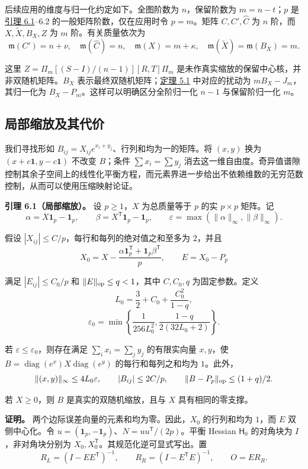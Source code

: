 \documentclass[11pt,a4paper]{article}
\makeatletter
\newcommand{\paperstatement}[3]{\par\addvspace{6pt}\Needspace{4\baselineskip}\phantomsection\def\@currentlabel{#2}\label{#3}\noindent\textbf{#1}\enspace}
\newcommand{\paperref}[2]{\hyperref[#1]{#2}}
\makeatother
\begin{document}
后续应用的维度与归一化约定如下。全图阶数为 \(n\)，保留阶数为 \(m=n-t\)；\(p\) 是\paperref{thm-6.1}{引理 6.1}--6.2 的一般矩阵阶数，仅在应用时令 \(p=m\)。矩阵 \(C,C',\widehat C\) 为 \(n\) 阶，而 \(X,\widetilde X,B_X,Z\) 为 \(m\) 阶。有关质量依次为
\[\mathfrak m(C')=n+\nu,\quad \mathfrak m(\widehat C)=n,\quad
\mathfrak m(X)=m+\kappa,\quad
\mathfrak m(\widetilde X)=\mathfrak m(B_X)=m.\]

这里 \(Z=\Pi_m[(S-I)/(n-1)][R,T]\Pi_m\) 是未作真实缩放的保留中心核，并非双随机矩阵。\(B_X\) 表示最终双随机矩阵；\paperref{thm-5.1}{定理 5.1} 中对应的扰动为 \(mB_X-J_m\)，其归一化为 \(B_X-P_m\)。这样可以明确区分全阶归一化 \(n-1\) 与保留阶归一化 \(m\)。

\subsection{局部缩放及其代价}\label{sec-6.1}

我们寻找形如 \(B_{ij}=X_{ij}e^{x_i+y_j}\)、行列和均为一的矩阵。将 \((x,y)\) 换为 \((x+c\mathbf1,y-c\mathbf1)\) 不改变 \(B\)；条件 \(\sum x_i=\sum y_j\) 消去这一维自由度。奇异值谱隙控制其余子空间上的线性化平衡方程，而元素界进一步给出不依赖维数的无穷范数控制，从而可以使用压缩映射论证。

\paperstatement{引理 6.1（局部缩放）。}{6.1}{thm-6.1} 设 \(p\ge1\)，\(X\) 为总质量等于 \(p\) 的实 \(p\times p\) 矩阵。记
\[\alpha=X\mathbf 1_p-\mathbf 1_p,\qquad \beta=X^{\mathsf T}\mathbf 1_p-\mathbf 1_p,\qquad \varepsilon=\max(\|\alpha\|_\infty,\|\beta\|_\infty).\]

假设 \(|X_{ij}|\le C/p\)，每行和每列的绝对值之和至多为 \(2\)，并且
\[X_0=X-\frac{\alpha\mathbf 1_p^{\mathsf T}+\mathbf 1_p\beta^{\mathsf T}}p,\qquad E=X_0-P_p\]

满足 \(|E_{ij}|\le C_0/p\) 和 \(\|E\|_{\rm op}\le q<1\)，其中 \(C,C_0,q\) 为固定参数。定义
\[L_0=\frac32+C_0+\frac{C_0^2}{1-q},\]
\nopagebreak[3]\[\varepsilon_0=\min\left\{\frac1{256L_0^2},\frac{1-q}{2(32L_0+2)}\right\}.\]

若 \(\varepsilon\le\varepsilon_0\)，则存在满足 \(\sum_i x_i=\sum_j y_j\) 的有限实向量 \(x,y\)，使 \(B=\operatorname{diag}(e^x)X\operatorname{diag}(e^y)\) 的每行和每列之和均为 \(1\)。此外，
\[\|(x,y)\|_\infty\le4L_0\varepsilon,\qquad |B_{ij}|\le2C/p,\qquad \|B-P_p\|_{\rm op}\le(1+q)/2.\]

若 \(X\ge0\)，则 \(B\) 是真实的双随机缩放，且与 \(X\) 具有相同的零支撑。

\textbf{证明。} 两个边际误差向量的元素和均为零。因此，\(X_0\) 的行列和均为 \(1\)，而 \(E\) 双侧中心化。令 \(u=(\mathbf 1_p,-\mathbf 1_p)\)、\(N=uu^{\mathsf T}/(2p)\)。平衡 Hessian \(\mathsf H_0\) 的对角块为 \(I\)，非对角块分别为 \(X_0,X_0^{\mathsf T}\)。其规范化逆可显式写出。置
\[R_L=(I-EE^{\mathsf T})^{-1},\qquad R_R=(I-E^{\mathsf T}E)^{-1},\qquad O=ER_R.\]
\end{document}
